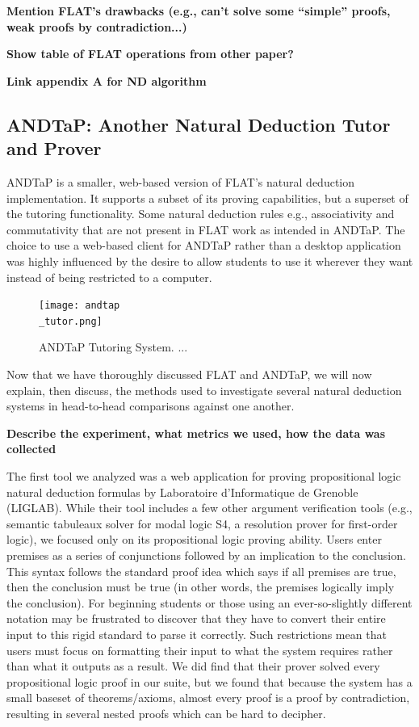 \documentclass[ms]{uncgdissertationexp2}
\theoremstyle{plain}
\theoremstyle{definition}
\theoremstyle{remark}
\newcommand{\titlecaption}[2]{\caption[#1]{#1. #2}}
\begin{document}
    \textbf{Mention FLAT's drawbacks (e.g., can't solve some ``simple'' proofs, weak proofs by contradiction...)}

    \textbf{Show table of FLAT operations from other paper?}

    \textbf{Link appendix A for ND algorithm}

    \subsection{ANDTaP: Another Natural Deduction Tutor and Prover}
    ANDTaP is a smaller, web-based version of FLAT's natural deduction implementation. It supports a subset of its proving capabilities, but a superset of the tutoring functionality. Some natural deduction rules e.g., associativity and commutativity that are not present in FLAT work as intended in ANDTaP. The choice to use a web-based client for ANDTaP rather than a desktop application was highly influenced by the desire to allow students to use it wherever they want instead of being restricted to a computer.

    \begin{figure}[h]
        \centering
        \texttt{[image: andtap\\\_tutor.png]}
        \titlecaption{ANDTaP Tutoring System}{...}
        \label{fig:andtap}
    \end{figure} 

    Now that we have thoroughly discussed FLAT and ANDTaP, we will now explain, then discuss, the methods used to investigate several natural deduction systems in head-to-head comparisons against one another.

    \textbf{Describe the experiment, what metrics we used, how the data was collected}

    The first tool we analyzed was a web application for proving propositional logic natural deduction formulas by Laboratoire d'Informatique de Grenoble (LIGLAB). While their tool includes a few other argument verification tools (e.g., semantic tabuleaux solver for modal logic S4, a resolution prover for first-order logic), we focused only on its propositional logic proving ability. Users enter premises as a series of conjunctions followed by an implication to the conclusion. This syntax follows the standard proof idea which says if all premises are true, then the conclusion must be true (in other words, the premises logically imply the conclusion). For beginning students or those using an ever-so-slightly different notation may be frustrated to discover that they have to convert their entire input to this rigid standard to parse it correctly. Such restrictions mean that users must focus on formatting their input to what the system requires rather than what it outputs as a result. We did find that their prover solved every propositional logic proof in our suite, but we found that because the system has a small baseset of theorems/axioms, almost every proof is a proof by contradiction, resulting in several nested proofs which can be hard to decipher.
    
\end{document}
